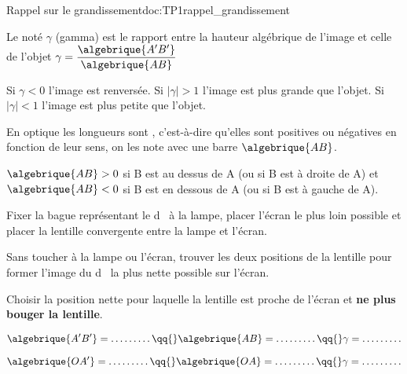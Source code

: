\begin{doc}{Rappel sur le grandissement}{doc:TP1rappel_grandissement}
  \begin{encart}
    Le  noté $\gamma$ (gamma) est le rapport entre la hauteur algébrique de l'image et celle de l'objet
    $\gamma = \dfrac{\algebrique{A'B'}}{\algebrique{AB}}$
  \end{encart}
  Si $\gamma < 0$ l'image est renversée.
  Si $|\gamma| > 1$ l'image est plus grande que l'objet. 
  Si $|\gamma| < 1$ l'image est plus petite que l'objet.
  
  \begin{encart}
    En optique les longueurs sont , c'est-à-dire qu'elles sont positives ou négatives en fonction de leur sens, on les note avec une barre $\algebrique{AB}$.
  \end{encart}
  \exemple $\algebrique{AB} > 0$ si B est au dessus de A (ou si B est à droite de A) et $\algebrique{AB} < 0$ si B est en dessous de A (ou si B est à gauche de A).
\end{doc}
\bigskip


\mesure
Fixer la bague représentant le \og d \fg\, à la lampe, placer l’écran le plus loin possible et placer la lentille convergente entre la lampe et l’écran.

Sans toucher à la lampe ou l'écran, trouver les deux positions de la lentille pour former l’image du \og d \fg\, la plus nette possible sur l’écran.
  
Choisir la position nette pour laquelle la lentille est proche de l’écran et \textbf{ne plus bouger la lentille}.


\vspace*{-8pt}
\begin{equation*}
  \algebrique{A'B'} = \ldots \ldots \ldots
  \qq{}
  \algebrique{AB} = \ldots \ldots \ldots
  \qq{}
  \gamma = \ldots \ldots \ldots
\end{equation*}



\vspace*{-8pt}
\begin{equation*}
  \algebrique{OA'} = \ldots \ldots \ldots
  \qq{}
  \algebrique{OA} = \ldots \ldots \ldots
  \qq{}
  \gamma = \ldots \ldots \ldots
\end{equation*}

